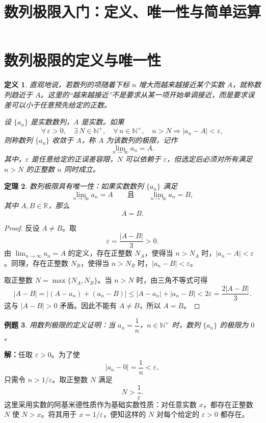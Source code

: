 \documentclass[UTF8,fontset=fandol,11pt]{ctexart}
\title{数列极限入门：定义、唯一性与简单运算}
\date{}
\newtheorem{definition}{定义}[section]
\newtheorem{theorem}[definition]{定理}
\newtheorem{example}[definition]{例题}
\begin{document}
\maketitle
\section{数列极限的定义与唯一性}\label{sec:S01}
\begin{definition}
直观地说，若数列的项随着下标 $n$ 增大而越来越接近某个实数 $A$，就称数列趋近于 $A$。这里的“越来越接近”不是要求从某一项开始单调接近，而是要求误差可以小于任意预先给定的正数。\label{def:sequence-limit}

设 $\{a_n\}$ 是实数数列，$A$ 是实数。如果
\[
\forall\,\varepsilon>0,\quad \exists\,N\in\mathbb{N}^+,\quad \forall\,n\in\mathbb{N}^+,\quad n>N\Longrightarrow |a_n-A|<\varepsilon,
\]
则称数列 $\{a_n\}$ 收敛于 $A$，称 $A$ 为该数列的极限，记作
\[
\lim_{n\to\infty}a_n=A.
\]
其中，$\varepsilon$ 是任意给定的正误差容限，$N$ 可以依赖于 $\varepsilon$，但选定后必须对所有满足 $n>N$ 的正整数 $n$ 同时成立。
\end{definition}
\begin{theorem}
数列极限具有唯一性：如果实数数列 $\{a_n\}$ 满足
\[
\lim_{n\to\infty}a_n=A\qquad\text{且}\qquad \lim_{n\to\infty}a_n=B,
\]
其中 $A,B\in\mathbb{R}$，那么
\[
A=B.
\]
\label{thm:limit-uniqueness}
\end{theorem}
\begin{proof}
反设 $A\ne B$。取
\[
\varepsilon=\frac{|A-B|}{3}>0.
\]
由 $\lim_{n\to\infty}a_n=A$ 的定义，存在正整数 $N_A$，使得当 $n>N_A$ 时，$|a_n-A|<\varepsilon$。同理，存在正整数 $N_B$，使得当 $n>N_B$ 时，$|a_n-B|<\varepsilon$。

取正整数 $N=\max\{N_A,N_B\}$。当 $n>N$ 时，由三角不等式可得
\[
|A-B|=|(A-a_n)+(a_n-B)|
\leq |A-a_n|+|a_n-B|
<2\varepsilon=\frac{2|A-B|}{3}.
\]
这与 $|A-B|>0$ 矛盾。因此不能有 $A\ne B$，所以 $A=B$。
\end{proof}
\begin{example}
用数列极限的定义证明：当 $a_n=\dfrac{1}{n}$，$n\in\mathbb{N}^+$ 时，数列 $\{a_n\}$ 的极限为 $0$。
\end{example}
\par\noindent\textbf{解：}任取 $\varepsilon>0$。为了使
\[
\left|a_n-0\right|=\frac{1}{n}<\varepsilon,
\]
只需令 $n>1/\varepsilon$。取正整数 $N$ 满足
\[
N>\frac{1}{\varepsilon}.
\]
这里采用实数的阿基米德性质作为基础实数性质：对任意实数 $x$，都存在正整数 $N$ 使 $N>x$。将其用于 $x=1/\varepsilon$，便知这样的 $N$ 对每个给定的 $\varepsilon>0$ 都存在。
\end{document}
